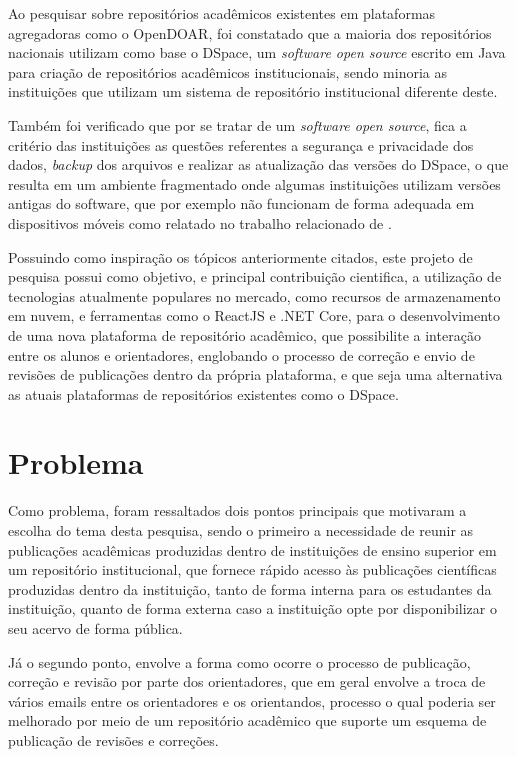 Ao pesquisar sobre repositórios acadêmicos existentes em plataformas
agregadoras como o OpenDOAR, foi constatado que a maioria dos repositórios
nacionais utilizam como base o DSpace, um \emph{software open source}
escrito em Java para criação de repositórios acadêmicos institucionais,
sendo minoria as instituições que utilizam um sistema de repositório
institucional diferente deste.

Também foi verificado que por se tratar de um \emph{software open source},
fica a critério das instituições as questões referentes a segurança e
privacidade dos dados, \emph{backup} dos arquivos e realizar as atualização
das versões do DSpace, o que resulta em um ambiente fragmentado onde algumas
instituições utilizam versões antigas do software, que por exemplo não
funcionam de forma adequada em dispositivos móveis como relatado no
trabalho relacionado de \cite{FernandesMacedes:2018}.

Possuindo como inspiração os tópicos anteriormente citados,
este projeto de pesquisa possui como objetivo, e principal contribuição
cientifica, a utilização de tecnologias atualmente populares no mercado,
como recursos de armazenamento em nuvem, e ferramentas como o ReactJS e
.NET Core, para o desenvolvimento de uma nova plataforma de repositório
acadêmico, que possibilite a interação entre os alunos e
orientadores, englobando o processo de correção e envio de revisões de
publicações dentro da própria plataforma, e que seja uma alternativa
as atuais plataformas de repositórios existentes como o DSpace.

\section{Problema} \label{sec::Problem}

Como problema, foram ressaltados dois pontos principais que motivaram a escolha do tema desta pesquisa, sendo o primeiro a necessidade de reunir as publicações acadêmicas produzidas dentro de instituições de ensino superior em um repositório institucional, que fornece rápido acesso às publicações científicas produzidas dentro da instituição, tanto de forma interna para os estudantes da instituição, quanto de forma externa caso a instituição opte por disponibilizar o seu acervo de forma pública.

Já o segundo ponto, envolve a forma como ocorre o processo de publicação, correção e revisão por parte dos orientadores, que em geral envolve a troca de vários emails entre os orientadores e os orientandos, processo o qual poderia ser melhorado por meio de um repositório acadêmico que suporte um esquema de publicação de revisões e correções.

